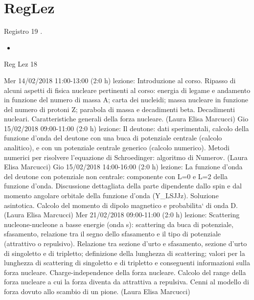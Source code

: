 \section{RegLez}
\begin{frame}[allowframebreaks]{Registro 19}
\cite{reg18}.
\listofkeywords

\begin{itemize}
\item 
\end{itemize}
\end{frame}

\begin{frame}[allowframebreaks]{Reg Lez 18}
\begin{itemize}  

    Mer 14/02/2018 11:00-13:00 (2:0 h) lezione: Introduzione al corso. Ripasso di alcuni aspetti di fisica nucleare pertinenti al corso: energia di legame e andamento in funzione del numero di massa A; carta dei nucleidi; massa nucleare in funzione del numero di protoni Z; parabola di massa e decadimenti beta. Decadimenti nucleari. Caratteristiche generali della forza nucleare. (Laura Elisa Marcucci)
    Gio 15/02/2018 09:00-11:00 (2:0 h) lezione: Il deutone: dati sperimentali, calcolo della funzione d'onda del deutone con una buca di potenziale centrale (calcolo analitico), e con un potenziale centrale generico (calcolo numerico). Metodi numerici per risolvere l'equazione di Schroedinger: algoritmo di Numerov. (Laura Elisa Marcucci)
    Gio 15/02/2018 14:00-16:00 (2:0 h) lezione: La funzione d'onda del deutone con potenziale non centrale: componente con L=0 e L=2 della funzione d'onda. Discussione dettagliata della parte dipendente dallo spin e dal momento angolare orbitale della funzione d'onda ({\cal Y}_{LSJJz}). Soluzione asintotica. Calcolo del momento di dipolo magnetico e probabilita` di onda D. (Laura Elisa Marcucci)
    Mer 21/02/2018 09:00-11:00 (2:0 h) lezione: Scattering nucleone-nucleone a basse energie (onda s): scattering da buca di potenziale, sfasamento, relazione tra il segno dello sfasamento e il tipo di potenziale (attrattivo o repulsivo). Relazione tra sezione d'urto e sfasamento, sezione d'urto di singoletto e di tripletto; definizione della lunghezza di scattering; valori per la lunghezza di scattering di singoletto e di tripletto e conseguenti informazioni sulla forza nucleare. Charge-independence della forza nucleare. Calcolo del range della forza nucleare a cui la forza diventa da attrattiva a repulsiva. Cenni al modello di forza dovuto allo scambio di un pione. (Laura Elisa Marcucci)

\end{itemize}
\end{frame}
